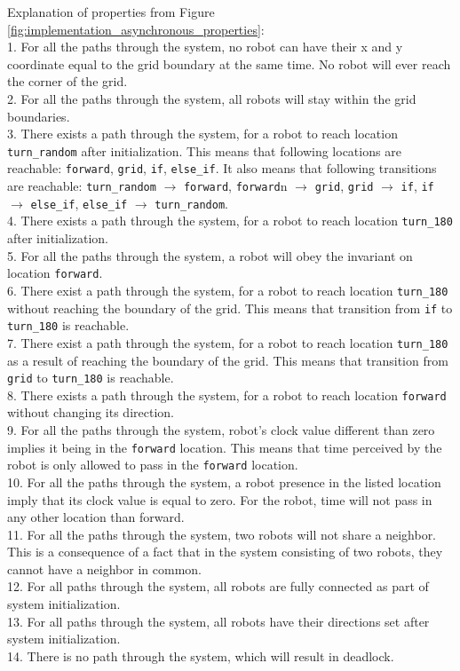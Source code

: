 \noindent
Explanation of properties from Figure \ref{fig:implementation_asynchronous_properties}:\\
1. For all the paths through the system, no robot can have their x and y coordinate equal to the grid boundary at the same time. No robot will ever reach the corner of the grid.\\
2. For all the paths through the system, all robots will stay within the grid boundaries.\\
3. There exists a path through the system, for a robot to reach location \texttt{turn\_random} after initialization. This means that following locations are reachable: \texttt{forward}, \texttt{grid}, \texttt{if}, \texttt{else\_if}. It also means that following transitions are reachable: \texttt{turn\_random} $\rightarrow$ \texttt{forward}, \texttt{forward}n $\rightarrow$ \texttt{grid}, \texttt{grid} $\rightarrow$ \texttt{if}, \texttt{if} $\rightarrow$ \texttt{else\_if}, \texttt{else\_if} $\rightarrow$ \texttt{turn\_random}.\\ 
4. There exists a path through the system, for a robot to reach location \texttt{turn\_180} after initialization.\\
5. For all the paths through the system, a robot will obey the invariant on location \texttt{forward}.\\
6. There exist a path through the system, for a robot to reach location \texttt{turn\_180} without reaching the boundary of the grid. This means that transition from \texttt{if} to \texttt{turn\_180} is reachable.\\
7. There exist a path through the system, for a robot to reach location \texttt{turn\_180} as a result of reaching the boundary of the grid. This means that transition from \texttt{grid} to \texttt{turn\_180} is reachable.\\
8. There exists a path through the system, for a robot to reach location \texttt{forward} without changing its direction. \\
9. For all the paths through the system, robot's clock value different than zero implies it being in the \texttt{forward} location. This means that time perceived by the robot is only allowed to pass in the \texttt{forward} location.\\
10. For all the paths through the system, a robot presence in the listed location imply that its clock value is equal to zero. For the robot, time will not pass in any other location than forward.\\
11. For all the paths through the system, two robots will not share a neighbor. This is a consequence of a fact that in the system consisting of two robots, they cannot have a neighbor in common.\\
12. For all paths through the system, all robots are fully connected as part of system initialization.\\
13. For all paths through the system, all robots have their directions set after system initialization.\\
14. There is no path through the system, which will result in deadlock.\\



